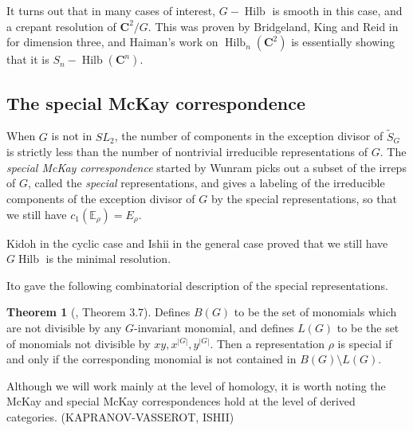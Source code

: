 \documentclass{amsart}[12pt]
\theoremstyle{definition}
\newtheorem{theorem}[dummy]{Theorem}
\newcommand{\C}{\mathbf{C}}
\DeclareMathOperator{\Hilb}{Hilb}
\begin{document}
It turns out that in many cases of interest, $G-\Hilb$ is smooth in this case, and a crepant resolution of $\C^2/G$.  This was proven by Bridgeland, King and Reid in \cite{BKR} for dimension three, and Haiman's work on $\Hilb_n(\C^2)$ is essentially showing that it is $S_n-\Hilb(\C^n)$.



\subsection{The special McKay correspondence}

When $G$ is not in $SL_2$, the number of components in the exception divisor of $\widetilde{S}_G$ is strictly less than the number of nontrivial irreducible representations of $G$.  The \emph{special McKay correspondence} started by Wunram \cite{wunram} picks out a subset of the irreps of $G$, called the \emph{special} representations, and gives a labeling of the irreducible components of the exception divisor of $G$ by the special representations, so that we still have $c_1(\mathbb{E}_\rho)=E_\rho$.

Kidoh \cite{Kidoh} in the cyclic case and Ishii \cite{ishii} in the general case proved that we still have $G\Hilb$ is the minimal resolution.

Ito \cite{ito} gave the following combinatorial description of the special representations.  

\begin{theorem}[\cite{ito}, Theorem 3.7]
Defines $B(G)$ to be the set of monomials which are not divisible by any $G$-invariant monomial, and defines $L(G)$ to be the set of monomials not divisible by $xy, x^{|G|}, y^{|G|}$.  Then a representation $\rho$ is special if and only if the corresponding monomial is not contained in $B(G)\setminus L(G)$.
\end{theorem}


Although we will work mainly at the level of homology, it is worth noting the McKay and special McKay correspondences hold at the level of derived categories.  (KAPRANOV-VASSEROT, ISHII)






\end{document}
